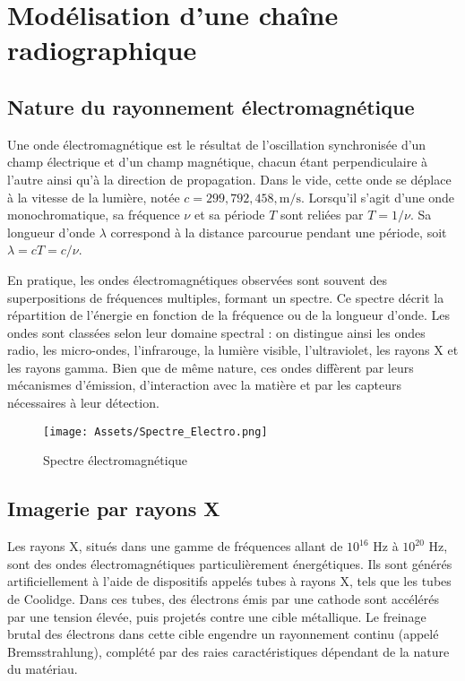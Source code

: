 \documentclass[12pt,a4paper]{report}
\begin{document}
\section{Modélisation d'une chaîne radiographique}
\subsection{Nature du rayonnement électromagnétique}
Une onde électromagnétique est le résultat de l’oscillation synchronisée d’un champ électrique et d’un champ magnétique, chacun étant perpendiculaire à l’autre ainsi qu’à la direction de propagation. Dans le vide, cette onde se déplace à la vitesse de la lumière, notée $c = 299,792,458 , \text{m/s}$. Lorsqu’il s’agit d’une onde monochromatique, sa fréquence $\nu$ et sa période $T$ sont reliées par $T = 1/\nu$. Sa longueur d’onde $\lambda$ correspond à la distance parcourue pendant une période, soit $\lambda = c T = c/\nu$.

En pratique, les ondes électromagnétiques observées sont souvent des superpositions de fréquences multiples, formant un spectre. Ce spectre décrit la répartition de l’énergie en fonction de la fréquence ou de la longueur d’onde. Les ondes sont classées selon leur domaine spectral : on distingue ainsi les ondes radio, les micro-ondes, l’infrarouge, la lumière visible, l’ultraviolet, les rayons X et les rayons gamma. Bien que de même nature, ces ondes diffèrent par leurs mécanismes d’émission, d’interaction avec la matière et par les capteurs nécessaires à leur détection.
\begin{figure}[H]
    \centering
    \texttt{[image: Assets/Spectre\_Electro.png]}
    \caption{Spectre électromagnétique}
    \label{fig:images}
\end{figure}

\subsection{Imagerie par rayons X}
Les rayons X, situés dans une gamme de fréquences allant de $10^{16}$ Hz à $10^{20}$ Hz, sont des ondes électromagnétiques particulièrement énergétiques. Ils sont générés artificiellement à l’aide de dispositifs appelés tubes à rayons X, tels que les tubes de Coolidge. Dans ces tubes, des électrons émis par une cathode sont accélérés par une tension élevée, puis projetés contre une cible métallique. Le freinage brutal des électrons dans cette cible engendre un rayonnement continu (appelé Bremsstrahlung), complété par des raies caractéristiques dépendant de la nature du matériau.
\end{document}
